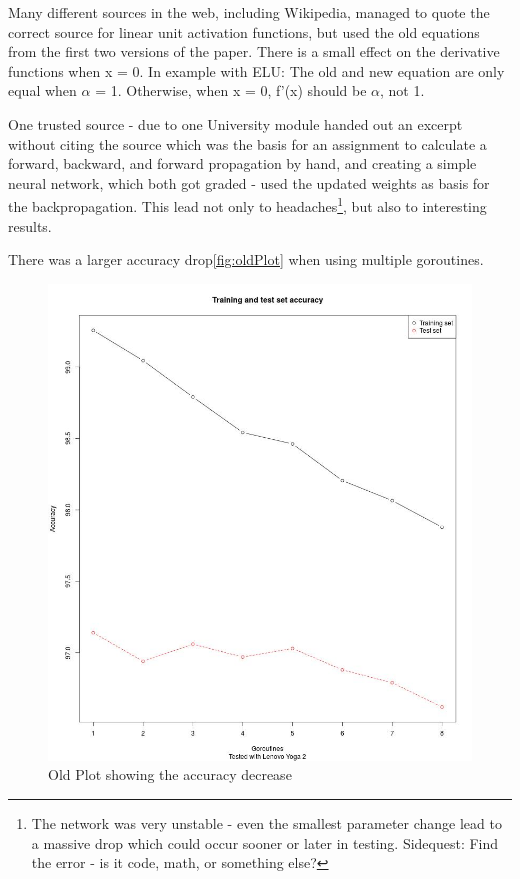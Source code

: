 \documentclass[11pt]{article}
\begin{document}
Many different sources in the web, including Wikipedia, managed to quote the correct source for linear unit activation functions, but used the old equations from the first two versions of the paper. There is a small effect on the derivative functions when x = 0. In example with ELU: The old and new equation are only equal when $\alpha$ = 1. Otherwise, when x = 0, f'(x) should be $\alpha$, not 1.

One trusted source - due to one University module handed out an excerpt without citing the source which was the basis for an assignment to calculate a forward, backward, and forward propagation by hand, and creating a simple neural network, which both got graded - used the updated weights as basis for the backpropagation. This lead not only to headaches\footnote{The network was very unstable - even the smallest parameter change lead to a massive drop which could occur sooner or later in testing. Sidequest: Find the error - is it code, math, or something else?}, but also to interesting results.

\newpage
There was a larger accuracy drop\autoref{fig:oldPlot} when using multiple goroutines.
\begin{figure}[H]
	\includegraphics[width=1.0\textwidth, height=0.75\textheight]{./Data/WrongMath/Images/accuracyPlotCorrect.jpg}
	\vspace{-1em}
	\caption{Old Plot showing the accuracy decrease}
	\vspace{-0.5em}
	\label{fig:oldPlot}
\end{figure}
\end{document}

